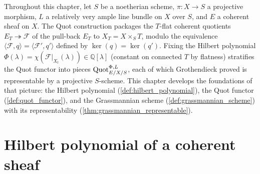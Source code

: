 Throughout this chapter, let \(S\) be a noetherian scheme, \(\pi : X \to S\) a
projective morphism, \(L\) a relatively very ample line bundle on \(X\) over \(S\),
and \(E\) a coherent sheaf on \(X\). The Quot construction packages the
\(T\)-flat coherent quotients \(E_T \twoheadrightarrow \mathcal{F}\) of the
pull-back \(E_T\) to \(X_T = X \times_S T\), modulo the equivalence
\(\langle \mathcal{F}, q\rangle = \langle \mathcal{F}', q'\rangle\) defined by
\(\ker(q) = \ker(q')\). Fixing the Hilbert polynomial
\(\Phi(\lambda) = \chi(\mathcal{F}|_{X_t}(\lambda)) \in \mathbb{Q}[\lambda]\)
(constant on connected \(T\) by flatness)
stratifies the Quot functor into pieces \(\operatorname{Quot}^{\Phi,L}_{E/X/S}\), each of
which Grothendieck proved is representable by a projective \(S\)-scheme.
This chapter develops the foundations of that picture: the Hilbert
polynomial (\cref{def:hilbert_polynomial}), the Quot functor
(\cref{def:quot_functor}), and the Grassmannian scheme
(\cref{def:grassmannian_scheme}) with its representability
(\cref{thm:grassmannian_representable}).


\section{Hilbert polynomial of a coherent sheaf}
\label{sec:hilbert_polynomial}

